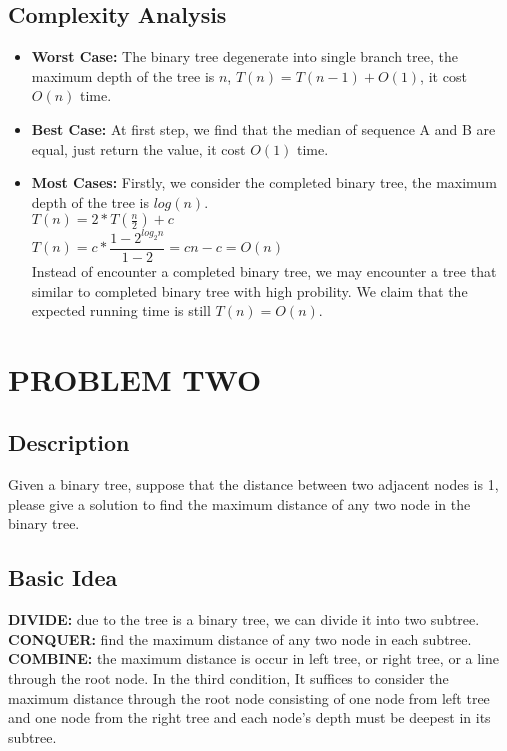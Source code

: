 \documentclass[UTF8,a4paper]{article}
\begin{document}
	\subsection{Complexity Analysis}
	\begin{itemize}
		\item{\textbf{Worst Case:}} The binary tree degenerate into single branch tree, the maximum depth of the tree is $ n $, $ T(n) = T(n-1)+O(1) $, it cost $ O(n) $ time.
		\item{\textbf{Best Case:}} At first step, we find that the median of sequence A and B are equal, just return the value, it cost $ O(1) $ time.
		\item{\textbf{Most Cases:}} Firstly, we consider the completed binary tree, the maximum depth of the tree is $ log(n) $.\\
		$ T(n) = 2*T(\frac{n}{2})+c $\\
		$ T(n) = c*\dfrac{1-2^{log_{2}n}}{1-2} = cn-c = O(n) $\\
		Instead of encounter a completed binary tree, we may encounter a tree that similar to completed binary tree with high probility. We claim that the expected running time is still $ T(n) = O(n) $.
	\end{itemize}

	\newpage
	\section{PROBLEM TWO}
	\subsection{Description}
	Given a binary tree, suppose that the distance between two adjacent nodes is 1, please give a solution to find the maximum distance of any two node in the binary tree.
	\subsection{Basic Idea}
	\textbf{\color{blue}DIVIDE: }due to the tree is a binary tree, we can divide it into two subtree.\\
	\textbf{\color{blue}CONQUER: }find the maximum distance of any two node in each subtree.\\
	\textbf{\color{blue}COMBINE: }the maximum distance is occur in left tree, or right tree, or a line through the root node.  In the third condition, It suffices to consider the maximum distance through the root node consisting of one node from left tree and one node from the right tree and each node's depth must be deepest in its subtree. 
\end{document}
